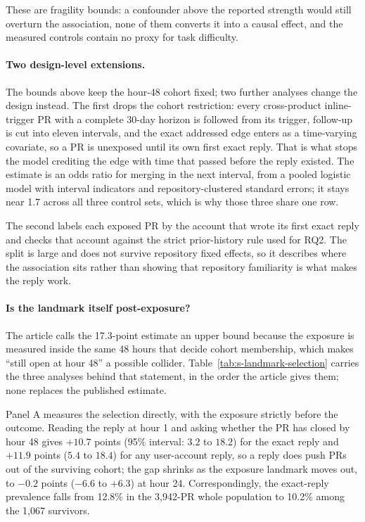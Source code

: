 \documentclass[pdflatex,sn-basic]{sn-jnl}
\begin{document}
These are fragility bounds: a confounder above the reported strength would still
overturn the association, none of them converts it into a causal effect, and the
measured controls contain no proxy for task difficulty.

\paragraph{Two design-level extensions.} The bounds above keep the hour-48
cohort fixed; two further analyses change the design instead. The first drops
the cohort restriction: every cross-product inline-trigger PR with a complete
30-day horizon is followed from its trigger, follow-up is cut into eleven
intervals, and the exact addressed edge enters as a time-varying covariate, so a
PR is unexposed until its own first exact reply. That is what stops the model
crediting the edge with time that passed before the reply existed. The estimate
is an odds ratio for merging in the next interval, from a pooled logistic model
with interval indicators and repository-clustered standard errors; it stays near
1.7 across all three control sets, which is why those three share one row.

The second labels each exposed PR by the account that wrote its first exact
reply and checks that account against the strict prior-history rule used for
RQ2. The split is large and does not survive repository fixed effects, so it
describes where the association sits rather than showing that repository
familiarity is what makes the reply work.

\paragraph{Is the landmark itself post-exposure?} The article calls the
17.3-point estimate an upper bound because the exposure is measured inside the
same 48 hours that decide cohort membership, which makes ``still open at hour
48'' a possible collider. Table~\ref{tab:s-landmark-selection} carries the three
analyses behind that statement, in the order the article gives them; none
replaces the published estimate.

Panel A measures the selection directly, with the exposure strictly before the
outcome. Reading the reply at hour 1 and asking whether the PR has closed by
hour 48 gives $+10.7$ points (95\% interval: $3.2$ to $18.2$) for the exact
reply and $+11.9$ points ($5.4$ to $18.4$) for any user-account reply, so a
reply does push PRs out of the surviving cohort; the gap shrinks as the exposure
landmark moves out, to $-0.2$ points ($-6.6$ to $+6.3$) at hour 24.
Correspondingly, the exact-reply prevalence falls from 12.8\% in the 3,942-PR
whole population to 10.2\% among the 1,067 survivors.
\end{document}
